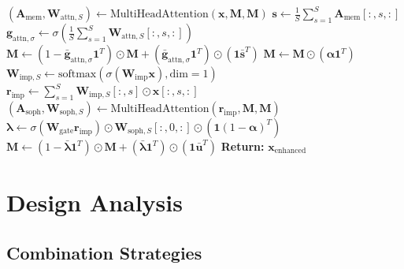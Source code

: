 \documentclass{article}
\begin{document}
\begin{algorithm}
\begin{algorithmic}[1]
        \STATE $(\mathbf{A}_{\text{mem}}, \mathbf{W}_{\text{attn},S}) \leftarrow \text{MultiHeadAttention}(\mathbf{x}, \mathbf{M}, \mathbf{M})$
        \STATE $\mathbf{s} \leftarrow \frac{1}{S}\sum_{s=1}^{S} \mathbf{A}_{\text{mem}}[:, s, :]$ 
        \STATE $\mathbf{g}_{\text{attn},\sigma} \leftarrow \sigma(\frac{1}{S}\sum_{s=1}^{S} \mathbf{W}_{\text{attn},S}[:, s, :])$ 
        \STATE $\mathbf{M} \leftarrow (1 - \bar{\mathbf{g}}_{\text{attn},\sigma} \mathbf{1}^T) \odot \mathbf{M} + (\bar{\mathbf{g}}_{\text{attn},\sigma} \mathbf{1}^T) \odot (\mathbf{1} \bar{\mathbf{s}}^T)$ 
        \STATE $\mathbf{M} \leftarrow \mathbf{M} \odot (\boldsymbol{\alpha} \mathbf{1}^T)$ 
        \STATE $\mathbf{W}_{\text{imp},S} \leftarrow \text{softmax}(\sigma(\mathbf{W}_{\text{imp}} \mathbf{x}), \text{dim}=1)$ 
        \STATE $\mathbf{r}_{\text{imp}} \leftarrow \sum_{s=1}^{S} \mathbf{W}_{\text{imp},S}[:, s] \odot \mathbf{x}[:, s, :]$ 
        \STATE $(\mathbf{A}_{\text{soph}}, \mathbf{W}_{\text{soph},S}) \leftarrow \text{MultiHeadAttention}(\mathbf{r}_{\text{imp}}, \mathbf{M}, \mathbf{M})$
        \STATE $\boldsymbol{\lambda} \leftarrow \sigma(\mathbf{W}_{\text{gate}} \mathbf{r}_{\text{imp}}) \odot \mathbf{W}_{\text{soph},S}[:, 0, :] \odot (\mathbf{1} (1 - \boldsymbol{\alpha})^T)$ 
        \STATE $\mathbf{M} \leftarrow (1 - \bar{\boldsymbol{\lambda}} \mathbf{1}^T) \odot \mathbf{M} + (\bar{\boldsymbol{\lambda}} \mathbf{1}^T) \odot (\mathbf{1} \bar{\mathbf{u}}^T)$ 
    \ENDIF
\ENDIF
\STATE \textbf{Return:} $\mathbf{x}_{\text{enhanced}}$
\end{algorithmic}
\end{algorithm}

\section{Design Analysis}

\subsection{Combination Strategies}
\end{document}
